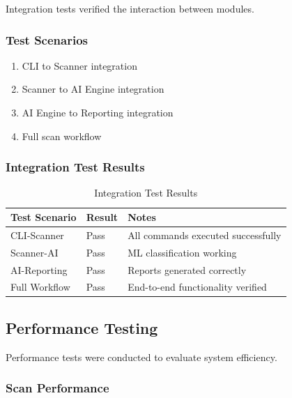 \documentclass[12pt,a4paper]{report}
\begin{document}
Integration tests verified the interaction between modules.

\subsubsection{Test Scenarios}

\begin{enumerate}
    \item CLI to Scanner integration
    \item Scanner to AI Engine integration
    \item AI Engine to Reporting integration
    \item Full scan workflow
\end{enumerate}

\subsubsection{Integration Test Results}

\begin{table}[H]
    \centering
    \caption{Integration Test Results}
    \label{tab:integration_tests}
    \begin{tabular}{@{}lll@{}}
        \toprule
        Test Scenario & Result & Notes \\
        \midrule
        CLI-Scanner & Pass & All commands executed successfully \\
        Scanner-AI & Pass & ML classification working \\
        AI-Reporting & Pass & Reports generated correctly \\
        Full Workflow & Pass & End-to-end functionality verified \\
        \bottomrule
    \end{tabular}
\end{table}

\subsection{Performance Testing}

Performance tests were conducted to evaluate system efficiency.

\subsubsection{Scan Performance}
\end{document}
